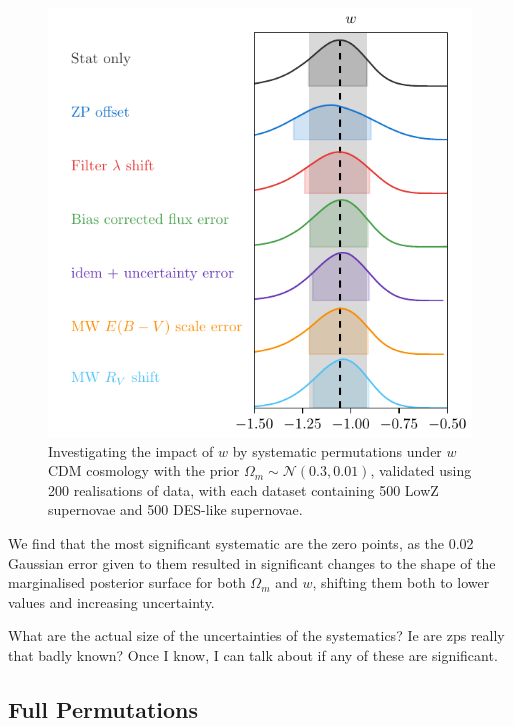 \documentclass[a4paper,fleqn,usenatbib]{mnras}
\newcommand{\red}{\color{red}}
\begin{document}
\begin{figure}
	\begin{center}
		\includegraphics[width=\columnwidth]{approximate_systematic_load_w_summary.pdf}
	\end{center}
	\caption{Investigating the impact of $w$ by systematic permutations under $w$CDM cosmology with the prior $\Omega_m \sim \mathcal{N}(0.3, 0.01)$, validated using 200 realisations of data, with each dataset containing 500 LowZ supernovae and 500 DES-like supernovae.}
	\label{fig:sys_w}
\end{figure}

We find that the most significant systematic are the zero points, as the 0.02 Gaussian error given to them resulted in significant changes to the shape of the marginalised posterior surface for both $\Omega_m$ and $w$, shifting them both to lower values and increasing uncertainty.

{\red What are the actual size of the uncertainties of the systematics? Ie are zps really that badly known? Once I know, I can talk about if any of these are significant.}

\subsection{Full Permutations}
\end{document}
